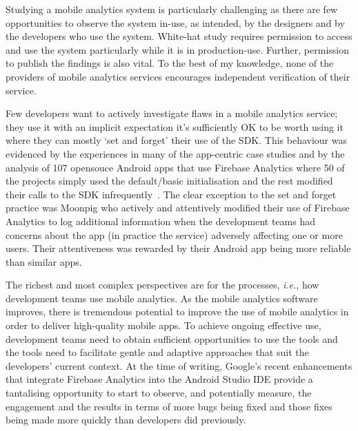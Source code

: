 Studying a mobile analytics system is particularly challenging as there are few opportunities to observe the system in-use, as intended, by the designers and by the developers who use the system. White-hat study requires permission to access and use the system particularly while it is in production-use. Further, permission to publish the findings is also vital. To the best of my knowledge, none of the providers of mobile analytics services encourages independent verification of their service. 

Few developers want to actively investigate flaws in a mobile analytics service; they use it with an implicit expectation it’s sufficiently OK to be worth using it where they can mostly `set and forget’ their use of the SDK. This behaviour was evidenced by the experiences in many of the app-centric case studies and by the analysis of 107 opensouce Android apps that use Firebase Analytics where 50 of the projects simply used the default/basic initialisation and the rest modified their calls to the SDK infrequently~. The clear exception to the set and forget practice was Moonpig who actively and attentively modified their use of Firebase Analytics to log additional information when the development teams had concerns about the app (in practice the service) adversely affecting one or more users. Their attentiveness was rewarded by their Android app being more reliable than similar apps.

The richest and most complex perspectives are for the processes, \textit{i.e.}, how development teams use mobile analytics. As the mobile analytics software improves, there is tremendous potential to improve the use of mobile analytics in order to deliver high-quality mobile apps. To achieve ongoing effective use, development teams need to obtain sufficient opportunities to use the tools and the tools need to facilitate gentle and adaptive approaches that suit the developers’ current context. At the time of writing, Google’s recent enhancements that integrate Firebase Analytics into the Android Studio IDE provide a tantalising opportunity to start to observe, and potentially measure, the engagement and the results in terms of more bugs being fixed and those fixes being made more quickly than developers did previously. 


